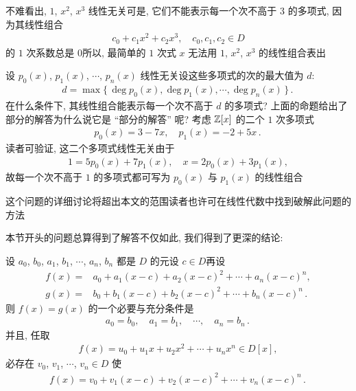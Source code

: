 \begin{remark}
    不难看出, $1$, $x^2$, $x^3$ 线性无关\period 可是, 它们不能表示每一个次不高于 $3$ 的多项式, 因为其线性组合
    \begin{align*}
        c_0 + c_1 x^2 + c_2 x^3, \quad c_0, c_1, c_2 \in D
    \end{align*}
    的 $1$ 次系数总是 $0$\period 所以, 最简单的 $1$ 次式 $x$ 无法用 $1$, $x^2$, $x^3$ 的线性组合表出\period

    设 $p_0 (x)$, $p_1 (x)$, $\cdots$, $p_n (x)$ 线性无关\period 设这些多项式的次的最大值为 $d$:
    \begin{align*}
        d = \max \{\, \deg p_0 (x), \deg p_1 (x), \cdots, \deg p_n (x) \,\} \period
    \end{align*}
    在什么条件下, 其线性组合能表示每一个次不高于 $d$ 的多项式? 上面的命题给出了部分的解答\period 为什么说它是 ``部分的解答'' 呢? 考虑 $\mathbb{Z}[x]$ 的二个 $1$ 次多项式
    \begin{align*}
        p_0 (x) = 3 - 7x, \quad p_1 (x) = -2 + 5x \period
    \end{align*}
    读者可验证, 这二个多项式线性无关\period 由于
    \begin{align*}
        1 = 5p_0 (x) + 7p_1 (x), \quad x = 2p_0 (x) + 3p_1 (x),
    \end{align*}
    故每一个次不高于 $1$ 的多项式都可写为 $p_0 (x)$ 与 $p_1 (x)$ 的线性组合\period

    这个问题的详细讨论将超出本文的范围\period 读者也许可在线性代数中找到破解此问题的方法\period
\end{remark}

本节开头的问题总算得到了解答\period 不仅如此, 我们得到了更深的结论:

\begin{proposition}
    设 $a_0$, $b_0$, $a_1$, $b_1$, $\cdots$, $a_n$, $b_n$ 都是 $D$ 的元\period 设 $c \in D$\period 再设
    \begin{align*}
        f(x) = {} & a_0 + a_1 (x - c) + a_2 (x - c)^2 + \cdots + a_n (x - c)^n,        \\
        g(x) = {} & b_0 + b_1 (x - c) + b_2 (x - c)^2 + \cdots + b_n (x - c)^n \period
    \end{align*}
    则 $f(x)=g(x)$ 的一个必要与充分条件是
    \begin{align*}
        a_0 = b_0, \quad a_1 = b_1, \quad \cdots, \quad a_n = b_n \period
    \end{align*}
    并且, 任取
    \begin{align*}
        f(x) = u_0 + u_1 x + u_2 x^2 + \cdots + u_n x^n \in D[x],
    \end{align*}
    必存在 $v_0$, $v_1$, $\cdots$, $v_n \in D$ 使
    \begin{align*}
        f(x) = v_0 + v_1 (x - c) + v_2 (x - c)^2 + \cdots + v_n (x - c)^n \period
    \end{align*}
\end{proposition}
